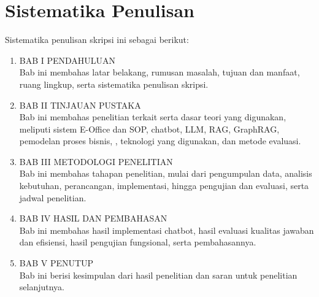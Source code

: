\section{Sistematika Penulisan}
\label{sec:sistematika}
Sistematika penulisan skripsi ini sebagai berikut:
\begin{enumerate}
\item BAB I PENDAHULUAN\\
Bab ini membahas latar belakang, rumusan masalah, tujuan dan manfaat, ruang lingkup, serta sistematika penulisan skripsi.
\item BAB II TINJAUAN PUSTAKA\\
Bab ini membahas penelitian terkait serta dasar teori yang digunakan, meliputi sistem E-Office dan SOP, chatbot, LLM, RAG, GraphRAG, pemodelan proses bisnis, \wgr{}, teknologi yang digunakan, dan metode evaluasi.
\item BAB III METODOLOGI PENELITIAN\\
Bab ini membahas tahapan penelitian, mulai dari pengumpulan data, analisis kebutuhan, perancangan, implementasi, hingga pengujian dan evaluasi, serta jadwal penelitian.
\item BAB IV HASIL DAN PEMBAHASAN\\
Bab ini membahas hasil implementasi chatbot, hasil evaluasi kualitas jawaban dan efisiensi, hasil pengujian fungsional, serta pembahasannya.
\item BAB V PENUTUP\\
Bab ini berisi kesimpulan dari hasil penelitian dan saran untuk penelitian selanjutnya.
\end{enumerate}

